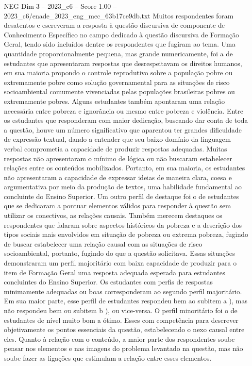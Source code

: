 \begin{textsample}{NEG Dim 3 – 2023\_c6 – Score 1.00 – 2023\_c6/enade\_2023\_eng\_mec\_63b17ce9db.txt}
Muitos respondentes foram desatentos e escreveram a resposta à questão discursiva de componente de Conhecimento Específico no campo dedicado à questão discursiva de Formação Geral, tendo sido incluídos dentre os respondentes que fugiram ao tema.
Uma quantidade proporcionalmente pequena, mas grande numericamente, foi a de estudantes que apresentaram respostas que desrespeitavam os direitos humanos, em sua maioria propondo o controle reprodutivo sobre a população pobre ou extremamente pobre como solução governamental para as situações de risco socioambiental comumente vivenciadas pelas populações brasileiras pobres ou extremamente pobres.
Alguns estudantes também apontaram uma relação necessária entre pobreza e ignorância ou mesmo entre pobreza e violência.
Entre os estudantes que responderam com maior dedicação, buscando dar conta de toda a questão, houve um número significativo que aparentou ter grandes dificuldade de expressão textual, dando a entender que seu baixo domínio da linguagem verbal comprometia a capacidade de produzir respostas adequadas.
Muitas respostas não apresentaram o mínimo de lógica ou não buscaram estabelecer relações entre os conteúdos mobilizados.
Portanto, em sua maioria, os estudantes não apresentaram a capacidade de expressar ideias de maneira clara, coesa e argumentativa por meio da produção de textos, uma habilidade fundamental ao concluinte do Ensino Superior.
Um outro perfil de destaque foi o de estudantes que se dedicaram a pontuar elementos válidos para responder à questão sem utilizar os conectivos, as relações causais.
Também merecem destaques os respondentes que falaram sobre aspectos históricos da pobreza e a descrição dos tipos sociais mais envolvidos em situação de pobreza ou extrema pobreza, fugindo de buscar estabelecer uma relação causal com as situações de risco socioambiental, portanto, fugindo do que a questão solicitava.
Essas situações demonstraram um perfil majoritário com baixa capacidade de produzir para o item de Formação Geral uma resposta adequada esperada para estudantes concluintes do Ensino Superior.
Os estudantes com perfis de respostas minimamente adequadas ou boas corresponderam ao segundo perfil majoritário.
Em sua maior parte, esse perfil de estudantes respondeu bem ao subitem a ), mas não respondeu bem ou subitem b ), ou vice-versa.
O perfil minoritário foi o de estudantes de nível muito bom a ótimo.
Esses com competência para descrever objetivamente os pontos essenciais da questão, estabelecendo o nexo causal entre eles.
Quanto à relação com o conteúdo, a maior parte dos respondentes soube pensar nos elementos e nas imagens do problema levantado na questão, mas não soube fazer as ligações que estimulam a relação entre esses elementos.

\end{textsample}
